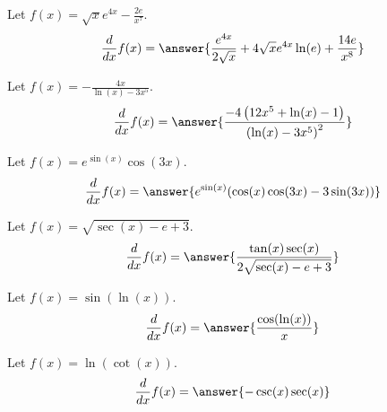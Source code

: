\documentclass{ximera}
\begin{document}
\begin{shuffle}
\begin{exercise}
Let $f(x)=\sqrt{x} e^{4 x}-\frac{2 e}{x^7}$.
\[
\ddx f(x) = \answer{\frac{e^{4 x}}{2 \sqrt{x}}+4 \sqrt{x} e^{4 x} \ln (e)+\frac{14 e}{x^8}}
\]
\end{exercise}

\begin{exercise}
Let $f(x)=-\frac{4 x}{\ln (x)-3 x^5}$.
\[
\ddx f(x) = \answer{\frac{-4 \left(12 x^5+\ln (x)-1\right)}{\left(\ln (x)-3 x^5\right)^2}}
\]
\end{exercise}

\begin{exercise}
Let $f(x)=e^{\sin (x)} \cos (3 x)$.
\[
\ddx f(x) = \answer{e^{\sin (x)} (\cos (x) \cos (3 x)-3 \sin (3 x))}
\]
\end{exercise}

\begin{exercise}
Let $f(x)=\sqrt{\sec (x)-e+3}$.
\[
\ddx f(x) = \answer{\frac{\tan (x) \sec (x)}{2 \sqrt{\sec (x)-e+3}}}
\]
\end{exercise}

\begin{exercise}
Let $f(x)=\sin (\ln (x))$.
\[
\ddx f(x) = \answer{\frac{\cos (\ln (x))}{x}}
\]
\end{exercise}

\begin{exercise}
Let $f(x)=\ln (\cot (x))$.
\[
\ddx f(x) = \answer{-\csc (x) \sec (x)}
\]
\end{exercise}
\end{shuffle}
\end{document}
